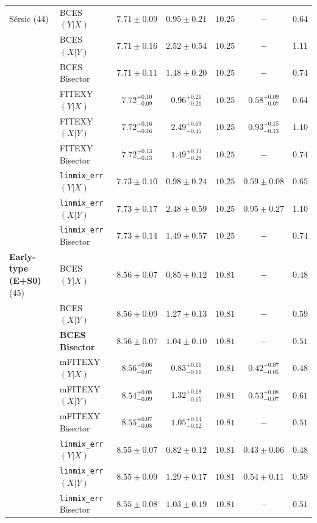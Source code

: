 \documentclass[preprint2]{emulateapj}
\begin{document}
\begin{table}
\begin{tabular}{llccccc}
 S\'ersic (44)		& BCES $(Y|X)$      & $7.71 \pm 0.09$ & $0.95 \pm 0.21$ & $10.25$ & $-$ & $0.64$ \\
 			& BCES $(X|Y)$      & $7.71 \pm 0.16$ & $2.52 \pm 0.54$ & $10.25$ & $-$ & $1.11$ \\
 			& BCES Bisector     & $7.71 \pm 0.11$ & $1.48 \pm 0.20$ & $10.25$ & $-$ & $0.74$ \\
 			& FITEXY $(Y|X)$    & $7.72^{+0.10}_{-0.09}$ & $0.96^{+0.21}_{-0.21}$ & $10.25$ & $0.58^{+0.09}_{-0.07}$ & $0.64$ \\
 			& FITEXY $(X|Y)$    & $7.72^{+0.16}_{-0.16}$ & $2.49^{+0.69}_{-0.45}$ & $10.25$ & $0.93^{+0.15}_{-0.13}$ & $1.10$ \\
 			& FITEXY Bisector   & $7.72^{+0.13}_{-0.13}$ & $1.49^{+0.33}_{-0.28}$ & $10.25$ & $-$    & $0.74$ \\
 			& {\tt linmix\_err} $(Y|X)$     & $7.73 \pm 0.10$ & $0.98 \pm 0.24$ & $10.25$ & $0.59 \pm 0.08$ & $0.65$ \\
 			& {\tt linmix\_err} $(X|Y)$     & $7.73 \pm 0.17$ & $2.48 \pm 0.59$ & $10.25$ & $0.95 \pm 0.27$ & $1.10$ \\
 			& {\tt linmix\_err} Bisector	& $7.73 \pm 0.14$ & $1.49 \pm 0.57$ & $10.25$ & $-$	& $0.74$ \\

{\bf Early-type (E+S0)} (45)  & BCES $(Y|X)$       & $8.56 \pm 0.07$ & $0.85 \pm 0.12$ & $10.81$ & $-$ & $0.48$ \\
                              & BCES $(X|Y)$       & $8.56 \pm 0.09$ & $1.27 \pm 0.13$ & $10.81$ & $-$ & $0.59$ \\
                              & {\bf BCES Bisector}& $\boldsymbol{8.56 \pm 0.07}$ & $\boldsymbol{1.04 \pm 0.10}$ & $\boldsymbol{10.81}$ & $-$ & $\boldsymbol{0.51}$ \\
                              & mFITEXY $(Y|X)$     & $8.56^{+0.06}_{-0.07}$ & $0.83^{+0.11}_{-0.11}$ & $10.81$ & $0.42^{+0.07}_{-0.05}$ & $0.48$ \\
                              & mFITEXY $(X|Y)$     & $8.54^{+0.08}_{-0.09}$ & $1.32^{+0.18}_{-0.15}$ & $10.81$ & $0.53^{+0.08}_{-0.07}$ & $0.61$ \\
                              & mFITEXY Bisector    & $8.55^{+0.07}_{-0.08}$ & $1.05^{+0.14}_{-0.12}$ & $10.81$ & $-$                    & $0.51$ \\
                              & {\tt linmix\_err} $(Y|X)$     & $8.55 \pm 0.07$ & $0.82 \pm 0.12$ & $10.81$ & $0.43 \pm 0.06$ & $0.48$ \\
                              & {\tt linmix\_err} $(X|Y)$     & $8.55 \pm 0.09$ & $1.29 \pm 0.17$ & $10.81$ & $0.54 \pm 0.11$ & $0.59$ \\
                              & {\tt linmix\_err} Bisector    & $8.55 \pm 0.08$ & $1.03 \pm 0.19$ & $10.81$ & $-$    & $0.51$ \\ [0.5em]


\end{tabular}
\end{table}
\end{document}
